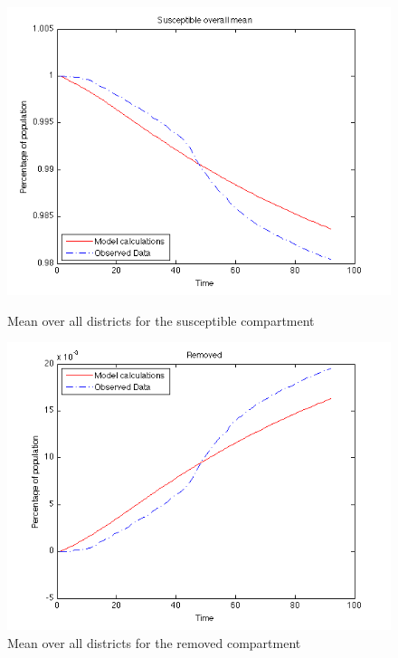 \documentclass[11pt]{article}
\begin{document}
\begin{figure}[htb]
  \begin{minipage}[t]{0.49\textwidth}
    \centering
    \includegraphics[width=\textwidth]{Bilder/susceptible_mean.png} 
    \caption{Mean over all districts for the susceptible compartment}
	\label{fig:mean_susceptible}
  \end{minipage}
  \hspace{0.02\textwidth}
  \begin{minipage}[t]{0.49\textwidth}
    \centering
    \includegraphics[width=\textwidth]{Bilder/removed_mean.png} 
    \caption{Mean over all districts for the removed compartment}
	\label{fig:mean_removed}
  \end{minipage}
\end{figure}
\end{document}
